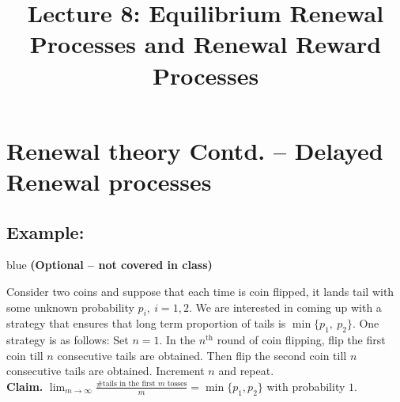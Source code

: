 \documentclass[a4paper,10pt,english]{article}
\title{Lecture 8: Equilibrium Renewal Processes and Renewal Reward Processes}
\author{}
\begin{document}
\maketitle
\section{Renewal theory Contd. -- Delayed Renewal processes }

\subsection{Example:}

\begin{color}{blue} {\bf (Optional -- not covered in class)} \end{color}

Consider two coins and suppose  that each time is coin flipped, it lands tail with some unknown probability $p_i,~i=1,2.$ We are interested in coming up with a strategy that ensures that long term proportion of tails is $\min\{p_1,~p_2\}.$ One strategy is as follows: Set $n = 1$. In the $n^\text{th}$ round of coin flipping, flip the first coin till $n$ consecutive tails are obtained. Then flip the second coin till $n$ consecutive tails are obtained. Increment $n$ and repeat. \\

{\bf Claim.} $\lim_{m \to \infty} \frac{\# \mbox{tails in the first
    $m$ tosses}}{m} = \min\{p_1, p_2\}$ with probability $1$.\\
\end{document}
